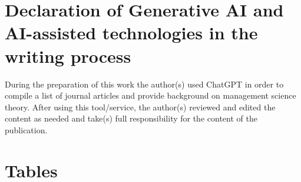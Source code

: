 \documentclass[12pt, a4paper]{article}
\begin{document}
\clearpage
\section{Declaration of Generative AI and AI-assisted technologies in the writing process}

During the preparation of this work the author(s) used ChatGPT in order to compile a list of journal articles and provide background on management science theory. After using this tool/service, the author(s) reviewed and edited the content as needed and take(s) full responsibility for the content of the publication.


\singlespacing

\clearpage



\clearpage
\appendix




  		
  \titleformat{\section}[display]
  {\raggedright\normalfont\Large\bfseries}{\appendixname\ \thesection }{0pt}{}



\section{Tables}
\label{app:tables}
\end{document}
